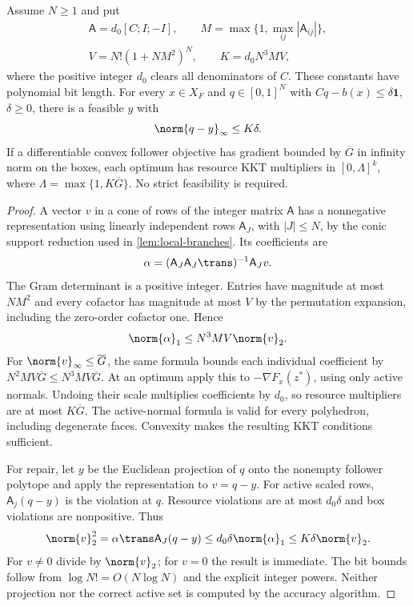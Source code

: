 \begin{lemma}
\label{lem:resource-constants}
Assume $N\ge1$ and put
\begin{equation}\label{eq:integer-repair-constants}
 \begin{gathered}
 \mathsf A=d_0[C;I;-I],\qquad
 M=\max\{1,\max_{ij}|\mathsf A_{ij}|\},\\
 V=N!(1+NM^2)^N,\qquad K=d_0N^3MV,
 \end{gathered}
\end{equation}
where the positive integer $d_0$ clears all denominators of $C$.
These constants have polynomial bit length. For every $x\in X_F$
and $q\in[0,1]^N$ with $Cq-b(x)\le\delta\mathbf1$, $\delta\ge0$,
there is a feasible $y$ with
\begin{equation}\label{eq:resource-repair}
                         \norm{q-y}_\infty\le K\delta.
\end{equation}
If a differentiable convex follower objective has gradient bounded by
$\overline G$ in infinity norm on the boxes, each optimum has resource
KKT multipliers in $[0,\Lambda]^k$, where
$\Lambda=\max\{1,K\overline G\}$. No strict feasibility is required.
\end{lemma}
\begin{proof}
A vector $v$ in a cone of rows of the integer matrix $\mathsf A$ has
a nonnegative representation using linearly independent rows
$\mathsf A_J$, with $|J|\le N$, by the conic support reduction used
in \cref{lem:local-branches}. Its coefficients are
\[
 \alpha=(\mathsf A_J\mathsf A_J\trans)^{-1}\mathsf A_Jv.
\]
The Gram determinant is a positive integer. Entries have magnitude at
most $NM^2$ and every cofactor has magnitude at most $V$ by the
permutation expansion, including the zero-order cofactor one. Hence
\[
 \norm{\alpha}_1\le N^3MV\norm{v}_2.
\]
For $\norm{v}_\infty\le\overline G$, the same formula bounds each
individual coefficient by $N^2MV\overline G\le N^3MV\overline G$.
At an optimum apply this to $-\nabla F_x(z^*)$, using only active
normals. Undoing their scale multiplies coefficients by $d_0$, so
resource multipliers are at most $K\overline G$. The active-normal
formula is valid for every polyhedron, including degenerate faces.
Convexity makes the resulting KKT conditions sufficient.

For repair, let $y$ be the Euclidean projection of $q$ onto the
nonempty follower polytope and apply the representation to $v=q-y$.
For active scaled rows, $\mathsf A_j(q-y)$ is the violation at $q$.
Resource violations are at most $d_0\delta$ and box violations are
nonpositive. Thus
\[
 \norm{v}_2^2=\alpha\trans\mathsf A_J(q-y)
 \le d_0\delta\norm{\alpha}_1\le K\delta\norm{v}_2.
\]
For $v\ne0$ divide by $\norm{v}_2$; for $v=0$ the result is immediate.
The bit bounds follow from $\log N!=O(N\log N)$ and the explicit
integer powers. Neither projection nor the correct active set is
computed by the accuracy algorithm.
\end{proof}

